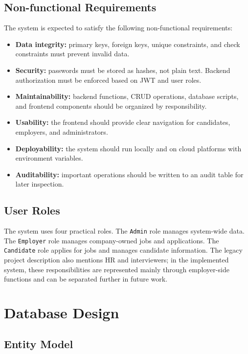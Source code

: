 \documentclass[11pt,a4paper]{report}
\begin{document}
\section{Non-functional Requirements}

The system is expected to satisfy the following non-functional requirements:

\begin{itemize}[leftmargin=1.5cm]
  \item \textbf{Data integrity:} primary keys, foreign keys, unique constraints, and check constraints must prevent invalid data.
  \item \textbf{Security:} passwords must be stored as hashes, not plain text. Backend authorization must be enforced based on JWT and user roles.
  \item \textbf{Maintainability:} backend functions, CRUD operations, database scripts, and frontend components should be organized by responsibility.
  \item \textbf{Usability:} the frontend should provide clear navigation for candidates, employers, and administrators.
  \item \textbf{Deployability:} the system should run locally and on cloud platforms with environment variables.
  \item \textbf{Auditability:} important operations should be written to an audit table for later inspection.
\end{itemize}

\section{User Roles}

The system uses four practical roles. The \texttt{Admin} role manages system-wide data. The \texttt{Employer} role manages company-owned jobs and applications. The \texttt{Candidate} role applies for jobs and manages candidate information. The legacy project description also mentions HR and interviewers; in the implemented system, these responsibilities are represented mainly through employer-side functions and can be separated further in future work.

\chapter{Database Design}

\section{Entity Model}
\end{document}
